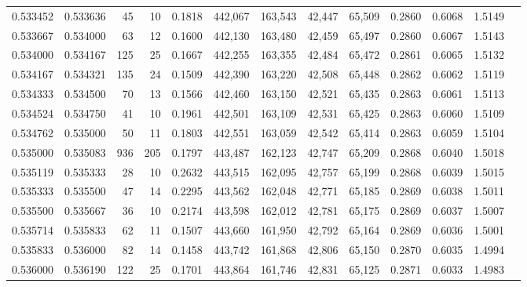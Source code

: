 \begin{tabular}{rrrrrrrrrrrrr}
0.533452 & 0.533636 &    45 &  10 &                                     0.1818 & 442,067 & 163,543 &  42,447 &  65,509 & 0.2860 & 0.6068 & 1.5149 \\
0.533667 & 0.534000 &    63 &  12 &                                     0.1600 & 442,130 & 163,480 &  42,459 &  65,497 & 0.2860 & 0.6067 & 1.5143 \\
0.534000 & 0.534167 &   125 &  25 &                                     0.1667 & 442,255 & 163,355 &  42,484 &  65,472 & 0.2861 & 0.6065 & 1.5132 \\
0.534167 & 0.534321 &   135 &  24 &                                     0.1509 & 442,390 & 163,220 &  42,508 &  65,448 & 0.2862 & 0.6062 & 1.5119 \\
0.534333 & 0.534500 &    70 &  13 &                                     0.1566 & 442,460 & 163,150 &  42,521 &  65,435 & 0.2863 & 0.6061 & 1.5113 \\
0.534524 & 0.534750 &    41 &  10 &                                     0.1961 & 442,501 & 163,109 &  42,531 &  65,425 & 0.2863 & 0.6060 & 1.5109 \\
0.534762 & 0.535000 &    50 &  11 &                                     0.1803 & 442,551 & 163,059 &  42,542 &  65,414 & 0.2863 & 0.6059 & 1.5104 \\
0.535000 & 0.535083 &   936 & 205 &                                     0.1797 & 443,487 & 162,123 &  42,747 &  65,209 & 0.2868 & 0.6040 & 1.5018 \\
0.535119 & 0.535333 &    28 &  10 &                                     0.2632 & 443,515 & 162,095 &  42,757 &  65,199 & 0.2868 & 0.6039 & 1.5015 \\
0.535333 & 0.535500 &    47 &  14 &                                     0.2295 & 443,562 & 162,048 &  42,771 &  65,185 & 0.2869 & 0.6038 & 1.5011 \\
0.535500 & 0.535667 &    36 &  10 &                                     0.2174 & 443,598 & 162,012 &  42,781 &  65,175 & 0.2869 & 0.6037 & 1.5007 \\
0.535714 & 0.535833 &    62 &  11 &                                     0.1507 & 443,660 & 161,950 &  42,792 &  65,164 & 0.2869 & 0.6036 & 1.5001 \\
0.535833 & 0.536000 &    82 &  14 &                                     0.1458 & 443,742 & 161,868 &  42,806 &  65,150 & 0.2870 & 0.6035 & 1.4994 \\
0.536000 & 0.536190 &   122 &  25 &                                     0.1701 & 443,864 & 161,746 &  42,831 &  65,125 & 0.2871 & 0.6033 & 1.4983 \\

\end{tabular}
